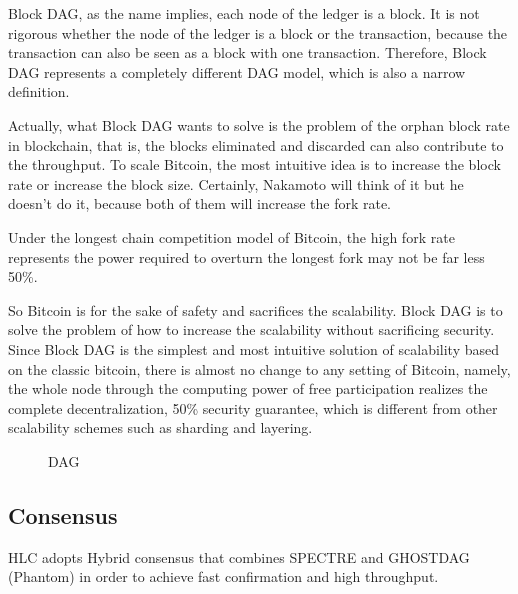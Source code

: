 \documentclass[a4paper,11pt]{article}
\begin{document}
Block DAG, as the name implies, each node of the ledger is a block. It is not rigorous whether the node of the ledger is a block or the transaction, because the transaction can also be seen as a block with one transaction. Therefore, Block DAG represents a completely different DAG model, which is also a narrow definition.

Actually, what Block DAG wants to solve is the problem of the orphan block rate in blockchain, that is, the blocks eliminated and discarded can also contribute to the throughput. To scale Bitcoin, the most intuitive idea is to increase the block rate or increase the block size. Certainly, Nakamoto will think of it but he doesn't do it, because both of them will increase the fork rate. 

Under the longest chain competition model of Bitcoin, the high fork rate represents the power required to overturn the longest fork may not be far less 50\%. 

So Bitcoin is for the sake of safety and sacrifices the scalability. Block DAG is to solve the problem of how to increase the scalability without sacrificing security. Since Block DAG is the simplest and most intuitive solution of scalability based on the classic bitcoin, there is almost no change to any setting of Bitcoin, namely, the whole node through the computing power of free participation realizes the complete decentralization, 50\% security guarantee, which is different from other scalability schemes such as sharding and layering. 


\begin{figure}[hbt]
	\centerline{%
	}
\caption{DAG}
\end{figure}

\subsection{Consensus}
HLC adopts Hybrid consensus that combines SPECTRE and GHOSTDAG (Phantom) in order to achieve fast confirmation and high throughput.
\end{document}
